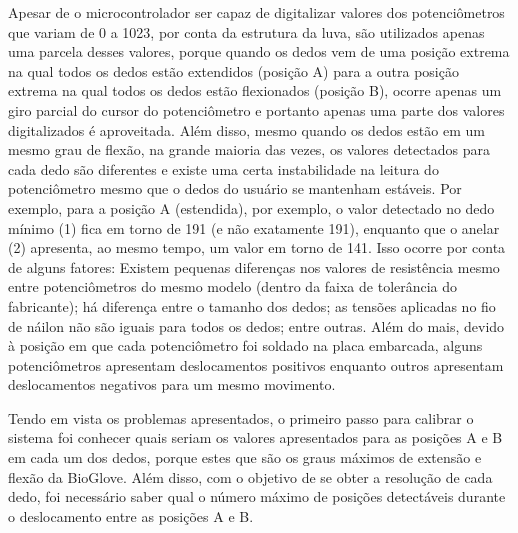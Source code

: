 \documentclass[
	12pt,				%
	openright,			%
	oneside,			%
	a4paper,			%
	english,			%
	brazil				%
	]{abntex2}
\begin{document}
		Apesar de o microcontrolador ser capaz de digitalizar valores dos potenciômetros que variam de 0 a 1023, por conta da estrutura da luva, são utilizados apenas uma parcela desses valores, porque quando os dedos vem de uma posição extrema na qual todos os dedos estão extendidos (posição A) para a outra posição extrema na qual todos os dedos estão flexionados (posição B), ocorre apenas um giro parcial do cursor do potenciômetro e portanto apenas uma parte dos valores digitalizados é aproveitada. Além disso, mesmo quando os dedos estão em um mesmo grau de flexão, na grande maioria das vezes, os valores detectados para cada dedo são diferentes e existe uma certa instabilidade na leitura do potenciômetro mesmo que o dedos do usuário se mantenham estáveis. Por exemplo, para a posição A (estendida), por exemplo, o valor detectado no dedo mínimo (1) fica em torno de 191 (e não exatamente 191), enquanto que o anelar (2) apresenta, ao mesmo tempo, um valor em torno de 141. Isso ocorre por conta de alguns fatores: Existem pequenas diferenças nos valores de resistência mesmo entre potenciômetros do mesmo modelo (dentro da faixa de tolerância do fabricante); há diferença entre o tamanho dos dedos; as tensões aplicadas no fio de náilon não são iguais para todos os dedos; entre outras. Além do mais, devido à posição em que cada potenciômetro foi soldado na placa embarcada, alguns potenciômetros apresentam deslocamentos positivos enquanto outros apresentam deslocamentos negativos para um mesmo movimento.


		

		Tendo em vista os problemas apresentados, o primeiro passo para calibrar o sistema foi conhecer quais seriam os valores apresentados para as posições A e B em cada um dos dedos, porque estes que são os graus máximos de extensão e flexão da BioGlove. Além disso, com o objetivo de se obter a resolução de cada dedo, foi necessário saber qual o número máximo de posições detectáveis durante o deslocamento entre as posições A e B.
\end{document}
